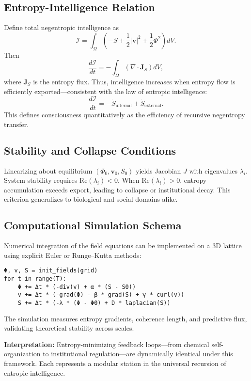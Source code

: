 \documentclass[11pt,a4paper]{article}
\begin{document}
\subsection{Entropy-Intelligence Relation}

Define total negentropic intelligence as
\[
\mathcal{I} = \int_\Omega \left( -S + \frac{1}{2} |\mathbf{v}|^2 + \frac{1}{2} \Phi^2 \right) dV.
\]
Then
\[
\frac{d\mathcal{I}}{dt} = -\int_\Omega (\nabla \cdot \mathbf{J}_S) dV,
\]
where $\mathbf{J}_S$ is the entropy flux.  Thus, intelligence increases when entropy flow is efficiently exported—consistent with the law of entropic intelligence:
\[
\boxed{\frac{d\mathcal{I}}{dt} = -\dot{S}_{\text{internal}} + \dot{S}_{\text{external}}.}
\]
This defines consciousness quantitatively as the efficiency of recursive negentropy transfer.

\subsection{Stability and Collapse Conditions}

Linearizing about equilibrium $(\Phi_0, \mathbf{v}_0, S_0)$ yields Jacobian $J$ with eigenvalues $\lambda_i$.  
System stability requires $\mathrm{Re}(\lambda_i) < 0$.  
When $\mathrm{Re}(\lambda_i) > 0$, entropy accumulation exceeds export, leading to collapse or institutional decay.  
This criterion generalizes to biological and social domains alike.

\subsection{Computational Simulation Schema}

Numerical integration of the field equations can be implemented on a 3D lattice using explicit Euler or Runge–Kutta methods:
\begin{verbatim}
Φ, v, S = init_fields(grid)
for t in range(T):
    Φ += Δt * (-div(v) + α * (S - S0))
    v += Δt * (-grad(Φ) - β * grad(S) + γ * curl(v))
    S += Δt * (-λ * (Φ - Φ0) + D * laplacian(S))
\end{verbatim}
The simulation measures entropy gradients, coherence length, and predictive flux, validating theoretical stability across scales.

\vspace{1em}
\noindent \textbf{Interpretation:}  
Entropy-minimizing feedback loops—from chemical self-organization to institutional regulation—are dynamically identical under this framework.  Each represents a modular station in the universal recursion of entropic intelligence.
\end{document}

